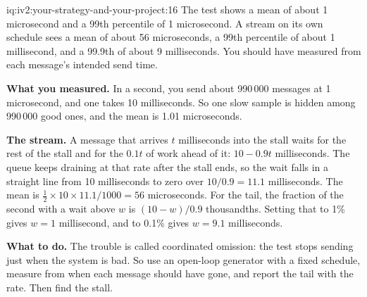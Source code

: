 \begin{solution}{iq:iv2:your-strategy-and-your-project:16}
The test shows a mean of about 1 microsecond and a 99th percentile of 1 microsecond. A stream on its own schedule sees a mean of about 56 microseconds, a 99th percentile of about 1 millisecond, and a 99.9th of about 9 milliseconds. You should have measured from each message's intended send time.

\textbf{What you measured.} In a second, you send about 990\,000 messages at 1 microsecond, and one takes 10 milliseconds. So one slow sample is hidden among 990\,000 good ones, and the mean is 1.01 microseconds.

\textbf{The stream.} A message that arrives $t$ milliseconds into the stall waits for the rest of the stall and for the $0.1t$ of work ahead of it: $10 - 0.9t$ milliseconds. The queue keeps draining at that rate after the stall ends, so the wait falls in a straight line from 10 milliseconds to zero over $10/0.9 = 11.1$ milliseconds. The mean is $\tfrac12 \times 10 \times 11.1/1000 = 56$ microseconds. For the tail, the fraction of the second with a wait above $w$ is $(10 - w)/0.9$ thousandths. Setting that to 1\% gives $w = 1$ millisecond, and to 0.1\% gives $w = 9.1$ milliseconds.

\textbf{What to do.} The trouble is called coordinated omission: the test stops sending just when the system is bad. So use an open-loop generator with a fixed schedule, measure from when each message should have gone, and report the tail with the rate. Then find the stall.

\end{solution}

